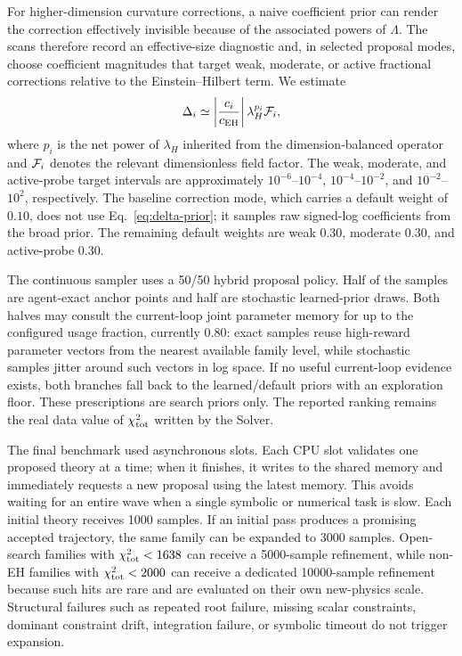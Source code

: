 \documentclass[aps,prd,twocolumn,superscriptaddress,nofootinbib,longbibliography]{revtex4-2}
\newcommand{\Lam}{\Lambda}
\begin{document}
For higher-dimension curvature corrections, a naive coefficient prior can render the correction effectively invisible because of the associated powers of $\Lam$.  The scans therefore record an effective-size diagnostic and, in selected proposal modes, choose coefficient magnitudes that target weak, moderate, or active fractional corrections relative to the Einstein--Hilbert term.  We estimate
\begin{equation}
\Delta_i\simeq
\left|\frac{c_i}{c_{\rm EH}}\right|\lambda_H^{p_i}{\cal F}_i ,
\label{eq:delta-prior}
\end{equation}
where $p_i$ is the net power of $\lambda_H$ inherited from the dimension-balanced operator and ${\cal F}_i$ denotes the relevant dimensionless field factor.  The weak, moderate, and active-probe target intervals are approximately $10^{-6}$--$10^{-4}$, $10^{-4}$--$10^{-2}$, and $10^{-2}$--$10^{2}$, respectively.  The baseline correction mode, which carries a default weight of $0.10$, does not use Eq.~\eqref{eq:delta-prior}; it samples raw signed-log coefficients from the broad prior.  The remaining default weights are weak $0.30$, moderate $0.30$, and active-probe $0.30$.

The continuous sampler uses a 50/50 hybrid proposal policy.  Half of the samples are agent-exact anchor points and half are stochastic learned-prior draws.  Both halves may consult the current-loop joint parameter memory for up to the configured usage fraction, currently $0.80$: exact samples reuse high-reward parameter vectors from the nearest available family level, while stochastic samples jitter around such vectors in log space.  If no useful current-loop evidence exists, both branches fall back to the learned/default priors with an exploration floor.  These prescriptions are search priors only.  The reported ranking remains the real data value of $\chi^2_{\rm tot}$ written by the Solver.

The final benchmark used asynchronous slots.  Each CPU slot validates one proposed theory at a time; when it finishes, it writes to the shared memory and immediately requests a new proposal using the latest memory.  This avoids waiting for an entire wave when a single symbolic or numerical task is slow.  Each initial theory receives 1000 samples.  If an initial pass produces a promising accepted trajectory, the same family can be expanded to 3000 samples.  Open-search families with $\chi^2_{\rm tot}<1638$ can receive a 5000-sample refinement, while non-EH families with $\chi^2_{\rm tot}<2000$ can receive a dedicated 10000-sample refinement because such hits are rare and are evaluated on their own new-physics scale.  Structural failures such as repeated root failure, missing scalar constraints, dominant constraint drift, integration failure, or symbolic timeout do not trigger expansion.
\end{document}
